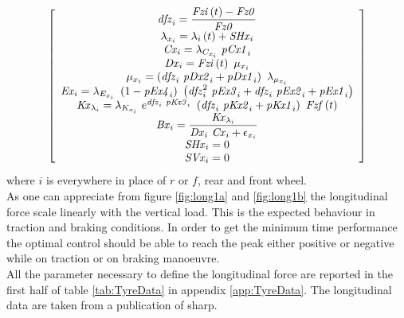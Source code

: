 %
\begin{equation}
\left[ \begin {array}{c} \displaystyle {\it dfz}_{i} =\frac{{\it Fzi} \left(t 
\right)-{\it Fz0} }{{\it Fz0} }\\ \lambda_{x_{i}} =
\lambda_{i} \left(t \right)+{\it SHx}_{i} \\ {\it Cx
}_{i} =\lambda_{C_{x_{i}}} ~{\it pCx1}_{i} \\ {\it 
Dx}_{i} ={\it Fzi} \left(t \right)~\mu_{x_{i}} \\ 
\mu_{x_{i}} =\left({\it dfz}_{i} ~{\it pDx2}_{i} +{\it pDx1}_{i} 
\right)~\lambda_{\mu_{x_{i}}} \\ {\it Ex}_{i} =
\lambda_{E_{x_{i}}} ~\left(1-{\it pEx4}_{i} \right)~\left({\it dfz}_{i
} ^{2}~{\it pEx3}_{i} +{\it dfz}_{i} ~{\it pEx2}_{i} +{\it pEx1}_{i} 
\right)\\ {\it Kx}_{\lambda_{i}} =\lambda_{K_{x_{i}}
} ~e^{{\it dfz}_{i} ~{\it pKx3}_{i} }~\left({\it dfz}_{i} ~{\it pKx2}_
{i} +{\it pKx1}_{i} \right)~{\it Fzf} \left(t \right)
\\ \displaystyle {\it Bx}_{i} =\frac{{\it Kx}_{\lambda_{i}} }{{
\it Dx}_{i} ~{\it Cx}_{i} +\epsilon_{x_{i}} }\\ {
\it SHx}_{i} =0\\ {\it SVx}_{i} =0\end {array}
 \right] 
\end{equation}
%
where $i$ is everywhere in place of $r$ or $f$, rear and front wheel.\\
As one can appreciate from figure \ref{fig:long1a} and \ref{fig:long1b} the longitudinal force scale linearly with the vertical load. This is the expected behaviour in traction and braking conditions. In order to get the minimum time performance the optimal control should be able to reach the peak either positive or negative while on traction or on braking manoeuvre.\\
All the parameter necessary to define the longitudinal force are reported in the first half of table \ref{tab:TyreData} in appendix \ref{app:TyreData}. The longitudinal data are taken from a publication of sharp.\cite{sharp2014method}
%
